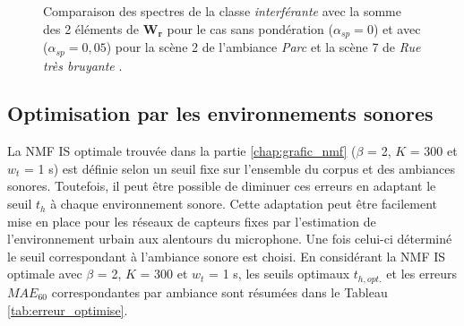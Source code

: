 \begin{figure}[h!]
\centering
{}%
\qquad
{}%
\caption{Comparaison des spectres de la classe \textit{interférante} avec la somme des 2 éléments de $\mathbf{W_r}$ pour le cas sans pondération ($\alpha_{sp}= 0$) et avec ($\alpha_{sp} = 0,05$) pour la scène 2 de l'ambiance \textit{Parc}  et la scène 7 de \textit{Rue très bruyante} .}
\label{fig:grafic_sp}
\end{figure}


\subsection{Optimisation par les environnements sonores}\label{part:optimisationESU}


La NMF IS optimale trouvée dans la partie \ref{chap:grafic_nmf} ($\beta$ = 2, $K$ = 300 et $w_t$ = 1 s) est définie selon un seuil fixe sur l'ensemble du corpus et des ambiances sonores. Toutefois, il peut être possible de diminuer ces erreurs en adaptant le seuil $t_h$ à chaque environnement sonore. 
Cette adaptation peut être facilement mise en place pour les réseaux de capteurs fixes par l'estimation de l'environnement urbain aux alentours du microphone. Une fois celui-ci déterminé le seuil correspondant à l'ambiance sonore est choisi. 
En considérant la NMF IS optimale avec $\beta$ = 2, $K$ = 300 et $w_t$ = 1 s, les seuils optimaux $t_{h,opt.}$ et les erreurs $MAE_{60}$ correspondantes par ambiance sont résumées dans le Tableau \ref{tab:erreur_optimise}.

